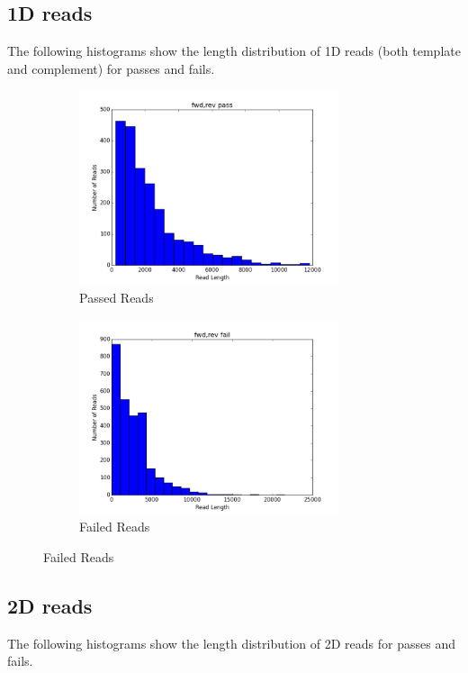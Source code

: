 \subsection*{1D reads}

        The following histograms show the length distribution of 1D reads (both template and complement) for passes and fails.

        \begin{figure}[h!]
		\begin{subfigure}[b]{0.45\textwidth}
    			\includegraphics[width=3in]{1Dpasses}
    			\caption{Passed Reads}
  		\end{subfigure}
  		\begin{subfigure}[b]{0.45\textwidth}
    			\includegraphics[width=3in]{1Dfailures}
    			\caption{Failed Reads}
  		\end{subfigure}
	\end{figure}
        

\subsection*{2D reads}

        The following histograms show the length distribution of 2D reads for passes and fails.

